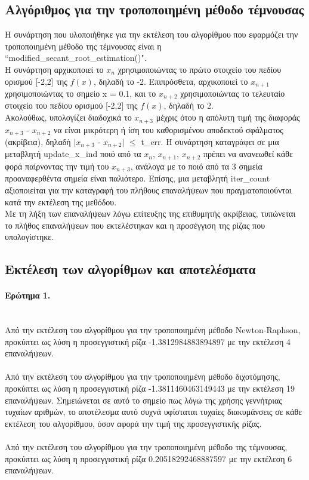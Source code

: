 \documentclass[a4paper,11pt]{article}
\newcommand{\lt}{\latintext}
\begin{document}
\subsection*{Αλγόριθμος για την τροποποιημένη μέθοδο τέμνουσας}
Η συνάρτηση που υλοποιήθηκε για την εκτέλεση του αλγορίθμου που εφαρμόζει την τροποποιημένη μέθοδο της τέμνουσας είναι η {\lt ``modified\_secant\_root\_estimation()"}. \\
Η συνάρτηση αρχικοποιεί το {$x_{n}$} χρησιμοποιώντας το πρώτο στοιχείο του πεδίου ορισμού [-2,2] της {\lt $f(x)$}, δηλαδή το -2. Επιπρόσθετα, αρχικοποιεί το {$x_{n+1}$} χρησιμοποιώντας το σημείο {\lt x = 0.1}, και το {$x_{n+2}$} χρησιμοποιώντας το τελευταίο στοιχείο του 	πεδίου ορισμού [-2,2] της {\lt $f(x)$}, δηλαδή το 2.\\
Ακολούθως, υπολογίζει διαδοχικά το {$x_{n+3}$} μέχρις ότου η απόλυτη τιμή της διαφοράς {$x_{n+3}$} - {$x_{n+2}$} να είναι μικρότερη ή ίση του καθορισμένου αποδεκτού σφάλματος (ακρίβεια), δηλαδή 
$|${$x_{n+3}$} - {$x_{n+2}$}$|$ {$\leq$} {\lt t\_err}. 
Η συνάρτηση καταγράφει σε μια μεταβλητή {update\_x\_ind} ποιό από τα {$x_{n}$}, {$x_{n+1}$}, {$x_{n+2}$} πρέπει να ανανεωθεί κάθε φορά παίρνοντας την τιμή του {$x_{n+3}$}, ανάλογα με το ποιό από τα 3 σημεία προαναφερθέντα σημεία είναι παλιότερο. Επίσης, μια μεταβλητή {\lt iter\_count} αξιοποιείται για την καταγραφή του πλήθους επαναλήψεων που πραγματοποιούνται κατά την εκτέλεση της μεθόδου.\\
Με τη λήξη των επαναλήψεων λόγω επίτευξης της επιθυμητής ακρίβειας, τυπώνεται το πλήθος επαναλήψεων που εκτελέστηκαν και η προσέγγιση της ρίζας που υπολογίστηκε. 
\subsection*{Εκτέλεση των αλγορίθμων και αποτελέσματα}
\paragraph{Ερώτημα 1.}\mbox{}\\
Από την εκτέλεση του αλγορίθμου για την τροποποιημένη μέθοδο {\lt Newton-Raphson}, προκύπτει ως λύση η προσεγγιστική ρίζα -1.3812984883894897 με την εκτέλεση 4 επαναλήψεων.\\
\\Από την εκτέλεση του αλγορίθμου για την τροποποιημένη μέθοδο διχοτόμησης, προκύπτει ως λύση η προσεγγιστική ρίζα -1.3811460463149443 με την εκτέλεση 19 επαναλήψεων. Σημειώνεται σε αυτό το σημείο πως λόγω της χρήσης γεννήτριας τυχαίων αριθμών, το αποτέλεσμα αυτό συχνά υφίσταται τυχαίες διακυμάνσεις σε κάθε εκτέλεση του αλγορίθμου, όσον αφορά την τιμή της προσεγγιστικής ρίζας.\\
\\Από την εκτέλεση του αλγορίθμου για την τροποποιημένη μέθοδο της τέμνουσας, προκύπτει ως λύση η προσεγγιστική ρίζα 0.20518292468887597 με την εκτέλεση 6 επαναλήψεων.
\end{document}
